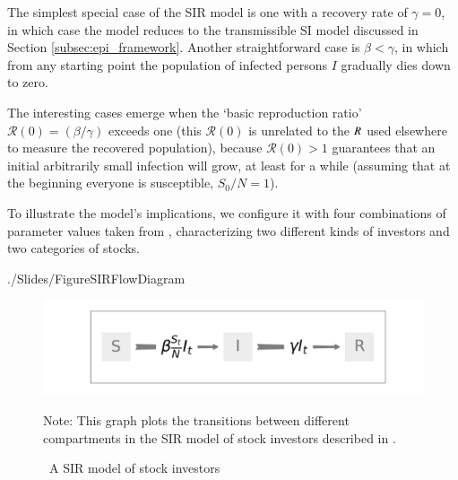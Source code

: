 The simplest special case of the SIR model is one with a recovery rate of $\gamma=0$, in which case the model reduces to the transmissible SI model discussed in Section \ref{subsec:epi_framework}.  Another straightforward case is $\beta < \gamma$, in which from any starting point the population of infected persons $I$ gradually dies down to zero.

\newcommand{\Rzero}{\mathcal{R}(0)}
The interesting cases emerge when the `basic reproduction ratio' $\Rzero = (\beta/\gamma)$ exceeds one (this $\Rzero$ is unrelated to the $\Recovered$ used elsewhere to measure the recovered population), because $\Rzero > 1$ guarantees that an initial arbitrarily small infection will grow, at least for a while (assuming that at the beginning everyone is susceptible, $S_{0}/N = 1$).

To illustrate the model's implications, we configure it with four combinations of parameter values taken from \cite{shiller1989survey}, characterizing two different kinds of investors and two categories of stocks.  %

\begin{verbatimwrite}{./Slides/FigureSIRFlowDiagram}%
    \begin{figure}[!ht] \centering  %
        \caption{ ~A SIR model of stock investors}
        \label{fig:sir_diagram}
        \centerline{\includegraphics[width=\textwidth]{./figures/flow_diagram}}
        \begin{flushleft}
            {\footnotesize Note: This graph plots the transitions between different compartments in the SIR model of stock investors described in \cite{shiller1989survey}. }
        \end{flushleft}
    \end{figure}
\end{verbatimwrite}%


